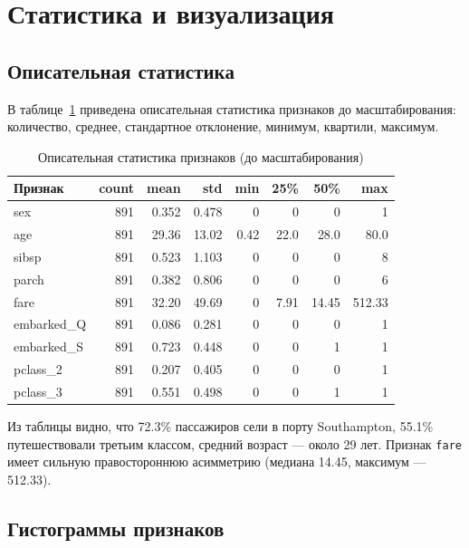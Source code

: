 \documentclass[12pt,a4paper]{article}
\begin{document}
\section{Статистика и визуализация}

\subsection{Описательная статистика}

В таблице~\ref{tab:stats} приведена описательная статистика признаков
до масштабирования: количество, среднее, стандартное отклонение,
минимум, квартили, максимум.

\begin{table}[H]
    \centering
    \caption{Описательная статистика признаков (до масштабирования)}
    \label{tab:stats}
    \small
    \begin{tabular}{lrrrrrrr}
        \toprule
        Признак & count & mean & std & min & 25\% & 50\% & max \\
        \midrule
        sex       & 891 & 0.352 & 0.478 & 0 & 0 & 0 & 1 \\
        age       & 891 & 29.36 & 13.02 & 0.42 & 22.0 & 28.0 & 80.0 \\
        sibsp     & 891 & 0.523 & 1.103 & 0 & 0 & 0 & 8 \\
        parch     & 891 & 0.382 & 0.806 & 0 & 0 & 0 & 6 \\
        fare      & 891 & 32.20 & 49.69 & 0 & 7.91 & 14.45 & 512.33 \\
        embarked\_Q & 891 & 0.086 & 0.281 & 0 & 0 & 0 & 1 \\
        embarked\_S & 891 & 0.723 & 0.448 & 0 & 0 & 1 & 1 \\
        pclass\_2   & 891 & 0.207 & 0.405 & 0 & 0 & 0 & 1 \\
        pclass\_3   & 891 & 0.551 & 0.498 & 0 & 0 & 1 & 1 \\
        \bottomrule
    \end{tabular}
\end{table}

Из таблицы видно, что 72.3\% пассажиров сели в порту Southampton,
55.1\% путешествовали третьим классом, средний возраст — около 29 лет.
Признак \texttt{fare} имеет сильную правостороннюю асимметрию
(медиана 14.45, максимум — 512.33).

\subsection{Гистограммы признаков}
\end{document}
